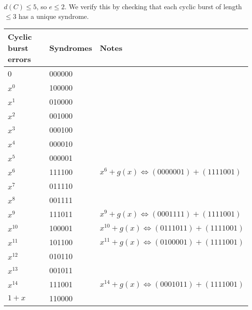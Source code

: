 $ d(C)\leqslant 5 $, so $ e\leqslant 2 $. We verify this by checking that
each cyclic burst of length $ \leqslant 3 $ has a unique syndrome.

\begin{table}[H]
    \centering
    \begin{tabularx}{\linewidth}{@{}YYY@{}}
        Cyclic burst errors & Syndromes  & Notes                                   \\
        \midrule
                           & 000000                                               \\
        \midrule
        $ x^0 $             & 100000                                               \\
        $ x^1 $             & 010000                                               \\
        $ x^2 $             & 001000                                               \\
        $ x^3 $             & 000100                                               \\
        $ x^4 $             & 000010                                               \\
        $ x^5 $             & 000001                                               \\
        $ x^6 $             & 111100     & $ x^6+g(x)\iff (0000001)+(1111001) $    \\
        $ x^7 $             & 011110                                               \\
        $ x^8 $             & 001111                                               \\
        $ x^9 $             & 111011     & $ x^9+g(x)\iff (0001111)+(1111001) $    \\
        $ x^{10} $          & 100001     & $ x^{10}+g(x)\iff (0111011)+(1111001) $ \\
        $ x^{11} $          & 101100     & $ x^{11}+g(x)\iff (0100001)+(1111001) $ \\
        $ x^{12} $          & 010110                                               \\
        $ x^{13} $          & 001011                                               \\
        $ x^{14} $          & 111001     & $ x^{14}+g(x)\iff (0001011)+(1111001) $ \\
        \midrule
        $ 1+x $             & 110000                                               \\

\end{tabularx}
\end{table}
